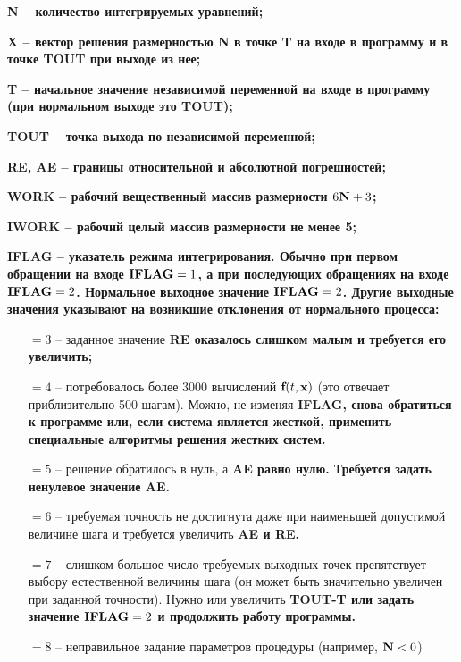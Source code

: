 \documentclass[../../calc-math-exam-2023.tex]{subfiles}
\begin{document}
    \bf{N} -- количество интегрируемых уравнений;

    \bf{X} -- вектор решения размерностью \bf{N} в точке \bf{T} на входе в программу и в точке \bf{TOUT} при выходе из нее;

    \bf{T} -- начальное значение независимой переменной на входе в программу (при нормальном выходе это \bf{TOUT});

    \bf{TOUT} -- точка выхода по независимой переменной;

    \bf{RE, AE} -- границы относительной и абсолютной погрешностей;

    \bf{WORK} -- рабочий вещественный массив размерности $6\bf{N} + 3$;

    \bf{IWORK} -- рабочий целый массив размерности не менее 5;

    \bf{IFLAG} -- указатель режима интегрирования. Обычно при первом обращении на входе $\bf{IFLAG} = 1$, а при последующих
    обращениях на входе $\bf{IFLAG} = 2$. Нормальное выходное значение $\bf{IFLAG} = 2$. Другие выходные значения указывают
    на возникшие отклонения от нормального процесса:
    \begin{enumerate}
        \item[$=3$ --] заданное значение \bf{RE} оказалось слишком малым и требуется его увеличить;
        \item[$=4$ --] потребовалось более 3000 вычислений $\bf{f}(t, \bf{x})$ (это отвечает приблизительно 500 шагам).
        Можно, не изменяя \bf{IFLAG}, снова обратиться к программе или, если система является жесткой, применить специальные
        алгоритмы решения жестких систем.
        \item[$=5$ --] решение обратилось в нуль, а \bf{AE} равно нулю. Требуется задать ненулевое значение \bf{AE}.
        \item[$=6$ --] требуемая точность не достигнута даже при наименьшей допустимой величине шага и требуется увеличить
        \bf{AE} и \bf{RE}.
        \item[$=7$ --] слишком большое число требуемых выходных точек препятствует выбору естественной величины шага (он
        может быть значительно увеличен при заданной точности). Нужно или увеличить \bf{TOUT-T} или задать значение
        $\bf{IFLAG} = 2$ и продолжить работу программы.
        \item[$=8$ --] неправильное задание параметров процедуры (например, $\bf{N} < 0$)
    \end{enumerate}
\end{document}
